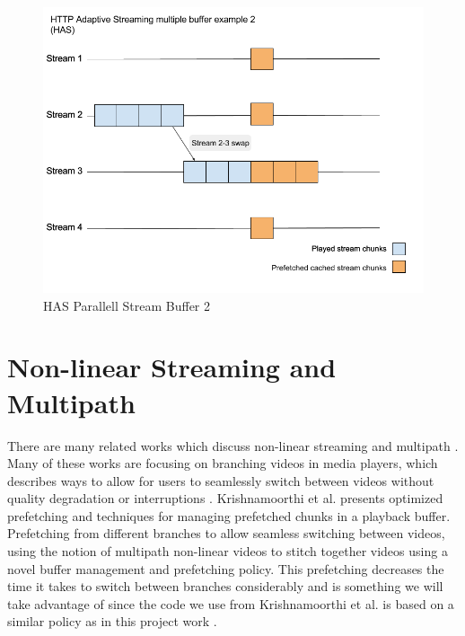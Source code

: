 \begin{figure}[!ht]
\begin{center}
\includegraphics[scale=0.4]{HAS2.png}
\caption{HAS Parallell Stream Buffer 2}
\label{fig:HAS2}
\end{center}
\end{figure}

\section{Non-linear Streaming and Multipath}
\label{sec:nonlinear}
There are many related works which discuss non-linear streaming and multipath \cite{qualbranch, hasmultipath,scalableOnDemand,optimizedbroadcast}. Many of these works are focusing on branching videos in media players, which describes ways to allow for users to seamlessly switch between videos without quality degradation or interruptions \cite{qualbranch, hasmultipath,scalableOnDemand}. Krishnamoorthi et al. \cite{hasmultipath} presents optimized prefetching and techniques for managing prefetched chunks in a playback buffer. Prefetching from different branches to allow seamless switching between videos, using the notion of multipath non-linear videos to stitch together videos using a novel buffer management and prefetching policy. This prefetching decreases the time it takes to switch between branches considerably and is something we will take advantage of since the code we use from Krishnamoorthi et al.\cite{qualbranch} is based on a similar policy as in this project work \cite{hasmultipath}. 

